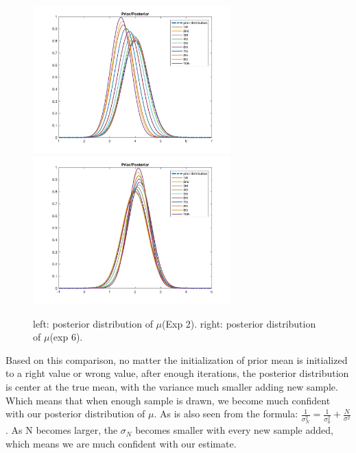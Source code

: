 \documentclass[a4paper]{article}
\begin{document}
\begin{spacing}{2.0}
\begin{itemize}
\begin{figure}[H]
	\centering
	\includegraphics[width=3in]{posterior2.jpg}
	\includegraphics[width=3in]{posterior6.jpg}
	\caption{left: posterior distribution of $\mu$(Exp 2). right: posterior distribution of $\mu$(exp 6).}
	\label{fig:side:b}
\end{figure}

Based on this comparison, no matter the initialization of prior mean is initialized to a right value or wrong value, after enough iterations, the posterior distribution is center at the true mean, with the variance much smaller adding new sample. Which means that when enough sample is drawn, we become much confident with our posterior distribution of $\mu$. As is also seen from the formula: $\displaystyle\frac{1}{\sigma_N^2} = \displaystyle\frac{1}{\sigma_0^2} + \displaystyle\frac{N}{\sigma^2}$. As N becomes larger, the $\sigma_N$ becomes smaller with every new sample added, which means we are much confident with our estimate.\\


\end{itemize}
\end{spacing}
\end{document}
